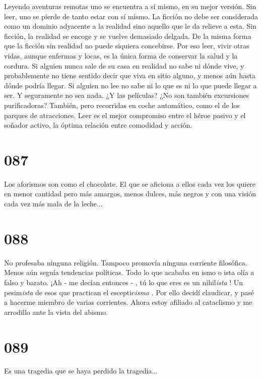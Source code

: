 \documentclass[a4paper,11pt,openright,twocolumn]{book}
\begin{document}
Leyendo aventuras remotas uno se encuentra a sí mismo, en su mejor versión. Sin leer, uno se pierde
de tanto estar con sí mismo. La ficción no debe ser considerada como un dominio adyacente a la realidad
sino aquello que le da relieve a esta. Sin ficción, la realidad se encoge y se vuelve demasiado delgada.
De la misma forma que la ficción sin realidad no puede siquiera concebirse. Por eso leer, vivir otras
vidas, aunque enfermas y locas, es la única forma de conservar la salud y la cordura. Si alguien nunca
sale de su casa en realidad no sabe ni dónde vive, y probablemente no tiene sentido decir que viva
en sitio alguno, y menos aún hasta dónde podría llegar. Si alguien no lee no sabe ni lo que es ni lo que
puede llegar a ser. Y seguramente no sea nada. ¿Y las películas? ¿No son también excursiones purificadoras?
También, pero recorridas en coche automático, como el de los parques de atracciones. Leer es el mejor compromiso
entre el héroe pasivo y el soñador activo, la óptima relación entre comodidad y acción. 

\section*{087}

Los aforismos son como el chocolate. El que se aficiona a ellos cada vez los quiere en menor cantidad
pero más amargos, menos dulces, más negros y con una visión cada vez más mala de la leche...

\section*{088}

No profesaba ninguna religión. Tampoco promovía ninguna corriente filosófica. Menos aún seguía tendencias
políticas. Todo lo que acababa en ismo o ista olía a falso y barato. ¡Ah - me decían entonces - , tú lo que
eres es un nihil{\it ista}  ! Un pesim{\it ista}   de esos que practican el esceptic{\it ismo}  . Por ello
decidí claudicar, y pasé a hacerme miembro de varias corrientes. Ahora estoy afiliado al cataclismo y
me arrodillo ante la vista del abismo.

\section*{089}

Es una tragedia que se haya perdido la tragedia...
\end{document}
